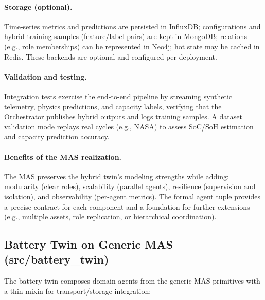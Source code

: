\paragraph{Storage (optional).} Time-series metrics and predictions are persisted in InfluxDB; configurations and hybrid training samples (feature/label pairs) are kept in MongoDB; relations (e.g., role memberships) can be represented in Neo4j; hot state may be cached in Redis. These backends are optional and configured per deployment.

\paragraph{Validation and testing.} Integration tests exercise the end-to-end pipeline by streaming synthetic telemetry, physics predictions, and capacity labels, verifying that the Orchestrator publishes hybrid outputs and logs training samples. A dataset validation mode replays real cycles (e.g., NASA) to assess SoC/SoH estimation and capacity prediction accuracy.

\paragraph{Benefits of the MAS realization.} The MAS preserves the hybrid twin’s modeling strengths while adding: modularity (clear roles), scalability (parallel agents), resilience (supervision and isolation), and observability (per-agent metrics). The formal agent tuple provides a precise contract for each component and a foundation for further extensions (e.g., multiple assets, role replication, or hierarchical coordination).


\subsection{Battery Twin on Generic MAS (src/battery\_twin)}
\label{subsec:battery-twin-on-mas}

The battery twin composes domain agents from the generic MAS primitives with a thin mixin for transport/storage integration:

